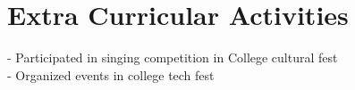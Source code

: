\documentclass[letterpaper]{twentysecondcv} %
\begin{document}
\section{Extra Curricular Activities}
\newline
\newline
- Participated in singing competition in College cultural fest\\
- Organized events in college tech fest
%
%
%





%
%
%
%

\end{document}
